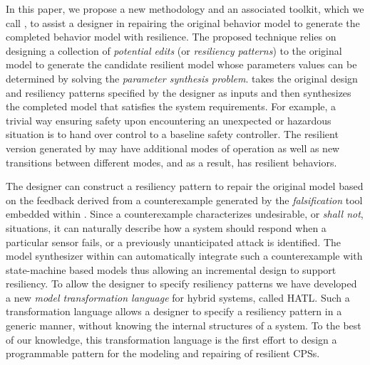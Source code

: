In this paper, we propose a new methodology and an associated toolkit, which we call \toolreaffirm, to assist a designer in repairing the original behavior model to generate the completed behavior model with resilience. 
%
The proposed technique relies on designing a collection of \emph{potential edits} (or \emph{resiliency patterns}) to the original model to generate the candidate resilient model whose parameters values can be determined by solving the \emph{parameter synthesis problem}. 
%
%
\toolreaffirm takes the original design and resiliency patterns specified by the designer as inputs and then synthesizes the completed model that satisfies the system requirements. For example, a trivial way ensuring safety upon encountering an unexpected or hazardous situation is to hand over control to a baseline safety controller. 
%
%
The resilient version generated by \toolreaffirm may have additional modes of operation as well as new transitions between different modes, and as a result, has resilient behaviors.
%

The designer can construct a resiliency pattern to repair the original model based on the feedback derived from a counterexample generated by the \emph{falsification} tool embedded within \toolreaffirm. 
%
%
Since a counterexample characterizes undesirable, or \emph{shall not}, situations, it can naturally describe how a system should respond when a particular sensor fails, or a previously unanticipated attack is identified. The model synthesizer within \toolreaffirm can automatically integrate such a counterexample with state-machine based models thus allowing an incremental design to support resiliency.
%
%
To allow the designer to specify resiliency patterns we have developed a new \emph{model transformation language} for hybrid systems, called HATL.
%
%
Such a transformation language allows a designer to specify a resiliency pattern in a generic manner, without knowing the internal structures of a system. To the best of our knowledge, this transformation language is the first effort to design a programmable pattern for the modeling and repairing of resilient CPSs. 

